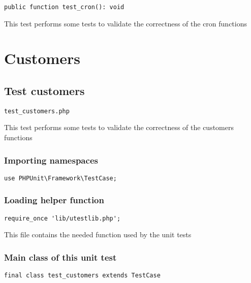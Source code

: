\documentclass[a4paper]{article}
\begin{document}
\begin{lstlisting}
public function test_cron(): void
\end{lstlisting}

This test performs some tests to validate the correctness
of the cron functions


\hypertarget{toc122}{}
\section{Customers}

\hypertarget{toc123}{}
\subsection{Test customers}

\begin{lstlisting}
test_customers.php
\end{lstlisting}

This test performs some tests to validate the correctness
of the customers functions

\hypertarget{toc124}{}
\subsubsection{Importing namespaces}

\begin{lstlisting}
use PHPUnit\Framework\TestCase;
\end{lstlisting}

\hypertarget{toc125}{}
\subsubsection{Loading helper function}

\begin{lstlisting}
require_once 'lib/utestlib.php';
\end{lstlisting}

This file contains the needed function used by the unit tests

\hypertarget{toc126}{}
\subsubsection{Main class of this unit test}

\begin{lstlisting}
final class test_customers extends TestCase
\end{lstlisting}

\hypertarget{toc127}{}
\end{document}
